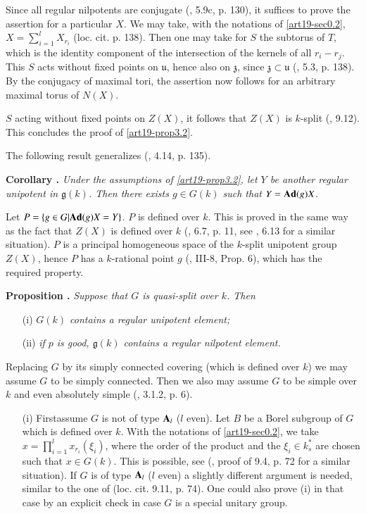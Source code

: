 Since all regular nilpotents are conjugate (\cite{art19-key14}, 5.9c, p. 130), it suffices to prove the assertion for a particular $X$. We may take, with the notations of \ref{art19-sec0.2}, $X=\sum\limits^{l}_{i=1}X_{r_{i}}$ (loc. cit. p. 138). Then one may take for $S$ the subtorus of $T$, which is the identity component of the intersection of the kernels of all $r_{i}-r_{j}$. This $S$ acts without fixed points on $\mathfrak{u}$, hence also on $\mathfrak{z}$, since $\mathfrak{z}\subset \mathfrak{u}$ (\cite{art19-key14}, 5.3, p. 138). By the conjugacy of maximal tori, the assertion now follows for an arbitrary maximal torus of $N(X)$.

$S$ acting without fixed points on $Z(X)$, it follows that $Z(X)$ is $k$-split (\cite{art19-key2}, 9.12). This concludes the proof of \ref{art19-prop3.2}.

The following result generalizes (\cite{art19-key13}, 4.14, p. 135).

\medskip
\noindent
{\bf Corollary .\label{art19-coro3.3}}
{\em Under the assumptions of \ref{art19-prop3.2}, let $Y$ be another regular unipotent in $\mathfrak{g}(k)$. Then there exists $g\in G(k)$ such that $Y=\mathbf{Ad}(g)X$.}
\smallskip

Let $P=\{g\in G|\mathbf{Ad} (g)X=Y\}$. $P$ is defined over $k$. This is proved in the same way as the fact that $Z(X)$ is defined over $k$ (\cite{art19-key10}, 6.7, p. 11, see \cite{art19-key2}, 6.13 for a similar situation). $P$ is a principal homogeneous space of the $k$-split unipotent group $Z(X)$, hence $P$ has a $k$-rational point $g$ (\cite{art19-key13}, III-8, Prop. 6), which has the required property.

\medskip
\noindent
{\bf Proposition .\label{art19-prop3.4}}
{\em Suppose that $G$ is quasi-split over $k$. Then}
\begin{itemize}
\item[\rm(i)] {\em $G(k)$ contains a regular unipotent element;}

\item[\rm(ii)] {\em if $p$ is good, $\mathfrak{g}(k)$ contains a regular nilpotent element.}
\end{itemize}

Replacing $G$ by its simply connected covering (which is defined over $k$) we may assume $G$ to be simply connected. Then we also may assume $G$ to be simple over $k$ and even absolutely simple (\cite{art19-key18}, 3.1.2, p. 6).
\begin{itemize}
\item[(i)] First\pageoriginale assume $G$ is not of type $\mathbf{A}_{l}$ ($l$ even). Let $B$ be a Borel subgroup of $G$ which is defined over $k$. With the notations of \ref{art19-sec0.2}, we take $x=\prod\limits^{l}_{i=1}x_{r_{i}}(\xi_{i})$, where the order of the product and the $\xi_{i}\in k^{*}_{s}$ are chosen such that $x\in G(k)$. This is possible, see (\cite{art19-key15}, proof of 9.4, p. 72 for a similar situation). If $G$ is of type $\mathbf{A}_{l}$ ($l$ even) a slightly different argument is needed, similar to the one of (loc. cit. 9.11, p. 74). One could also prove (i) in that case by an explicit check in case $G$ is a special unitary group.
\end{itemize}

